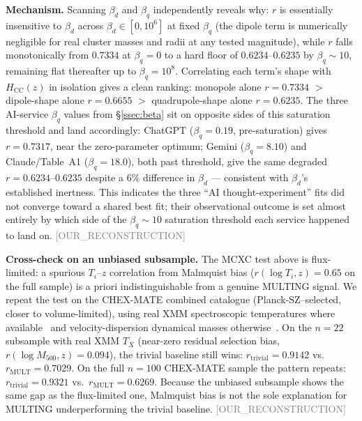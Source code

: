\documentclass[twocolumn,prd,amsmath,amssymb,floatfix]{revtex4-2}
\newcommand{\reconstruction}{\textcolor{gray}{\small[OUR\_RECONSTRUCTION]}}
\begin{document}
\textbf{Mechanism.} Scanning $\beta_d$ and $\beta_q$ independently reveals
why: $r$ is essentially insensitive to $\beta_d$ across
$\beta_d \in [0, 10^6]$ at fixed $\beta_q$ (the dipole term is numerically
negligible for real cluster masses and radii at any tested magnitude), while
$r$ falls monotonically from $0.7334$ at $\beta_q=0$ to a hard floor of
$0.6234$--$0.6235$ by $\beta_q \sim 10$, remaining flat thereafter up to
$\beta_q=10^8$. Correlating each term's shape with $H_\mathrm{CC}(z)$ in
isolation gives a clean ranking: monopole alone $r=0.7334$ $>$ dipole-shape
alone $r=0.6655$ $>$ quadrupole-shape alone $r=0.6235$. The three AI-service
$\beta_q$ values from \S\ref{ssec:beta} sit on opposite sides of this
saturation threshold and land accordingly: ChatGPT ($\beta_q=0.19$, pre-saturation)
gives $r=0.7317$, near the zero-parameter optimum; Gemini ($\beta_q=8.10$)
and Claude/Table~A1 ($\beta_q=18.0$), both past threshold, give the same
degraded $r=0.6234$--$0.6235$ despite a $6\%$ difference in $\beta_d$ ---
consistent with $\beta_d$'s established inertness. This indicates the three
``AI thought-experiment'' fits did not converge toward a shared best fit;
their observational outcome is set almost entirely by which side of the
$\beta_q \sim 10$ saturation threshold each service happened to land on.
\reconstruction

\textbf{Cross-check on an unbiased subsample.} The MCXC test above is
flux-limited: a spurious $T_i$--$z$ correlation from Malmquist bias
($r(\log T_i, z) = 0.65$ on the full sample) is a priori indistinguishable
from a genuine MULTING signal. We repeat the test on the CHEX-MATE
combined catalogue (Planck-SZ--selected, closer to volume-limited), using
real XMM spectroscopic temperatures where available~\cite{rossetti2024} and
velocity-dispersion dynamical masses otherwise~\cite{sereno2025}. On the
$n=22$ subsample with real XMM $T_X$ (near-zero residual selection bias,
$r(\log M_{500}, z) = 0.094$), the trivial baseline still wins:
$r_\mathrm{trivial} = 0.9142$ vs.\ $r_\mathrm{MULT} = 0.7029$. On the full
$n=100$ CHEX-MATE sample the pattern repeats: $r_\mathrm{trivial}=0.9321$
vs.\ $r_\mathrm{MULT}=0.6269$. Because the unbiased subsample shows the same
gap as the flux-limited one, Malmquist bias is not the sole explanation for
MULTING underperforming the trivial baseline.
\reconstruction
\end{document}
